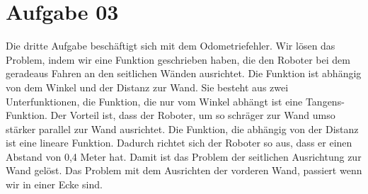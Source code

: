 \newpage
\section{Aufgabe 03}
Die dritte Aufgabe besch\"aftigt sich mit dem Odometriefehler.
Wir l\"osen das Problem, indem wir eine Funktion geschrieben haben,
die den Roboter bei dem geradeaus Fahren an den seitlichen W\"anden ausrichtet.
Die Funktion ist abh\"angig von dem Winkel und der Distanz zur Wand.
Sie besteht aus zwei Unterfunktionen, die Funktion, die nur vom Winkel abh\"angt ist eine Tangens-Funktion.
Der Vorteil ist, dass der Roboter, um so schr\"ager zur Wand umso st\"arker parallel zur Wand ausrichtet.
Die Funktion, die abh\"angig von der Distanz ist eine lineare Funktion.
Dadurch richtet sich der Roboter so aus, dass er einen Abstand von 0,4 Meter hat.
Damit ist das Problem der seitlichen Ausrichtung zur Wand gel\"ost.
Das Problem mit dem Ausrichten der vorderen Wand, passiert wenn wir in einer Ecke sind.
